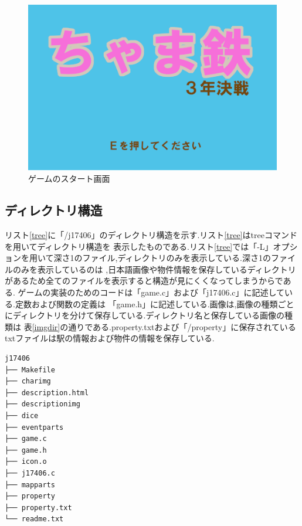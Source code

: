 \documentclass[a4j]{jarticle}
\begin{document}
    \begin{figure}[H]
        \centering
        \includegraphics[scale=1.8]{sp4.png}
        \caption{ゲームのスタート画面}
         \label{sp4}
        \end{figure}

      \subsection{ディレクトリ構造}
      リスト\ref{tree}に「/j17406」のディレクトリ構造を示す.リスト\ref{tree}はtreeコマンドを用いてディレクトリ構造を
      表示したものである.リスト\ref{tree}では「-L」オプションを用いて深さ1のファイル,ディレクトリのみを表示している.深さ1のファイルのみを表示しているのは
      ,日本語画像や物件情報を保存しているディレクトリがあるため全てのファイルを表示すると構造が見にくくなってしまうからである.
      ゲームの実装のためのコードは「game.c」および「j17406.c」に記述している.定数および関数の定義は
      「game.h」に記述している.画像は,画像の種類ごとにディレクトリを分けて保存している.ディレクトリ名と保存している画像の種類は
      表\ref{imgdir}の通りである.property.txtおよび「/property」に保存されているtxtファイルは駅の情報および物件の情報を保存している.
    
        \begin{lstlisting}[basicstyle=\ttfamily\footnotesize, frame=single,label=tree,caption=ディレクトリ構造]
j17406
├── Makefile
├── charimg
├── description.html
├── descriptionimg
├── dice
├── eventparts
├── game.c
├── game.h
├── icon.o
├── j17406.c
├── mapparts
├── property
├── property.txt
└── readme.txt
        \end{lstlisting}    
        
\end{document}
